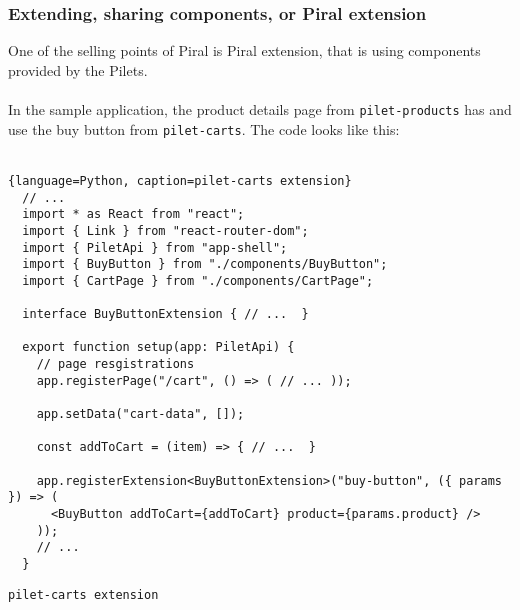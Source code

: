 \documentclass[a4paper]{book}
\begin{document}
\subsubsection{Extending, sharing components, or Piral extension}
One of the selling points of Piral is Piral extension, that is using components provided by the Pilets. 
\\ \\
In the sample application, the product details page from \verb|pilet-products| has and use the buy button from \verb|pilet-carts|. The code looks like this:
\\ \\

\begin{lstlisting}{language=Python, caption=pilet-carts extension}
  // ...
  import * as React from "react";
  import { Link } from "react-router-dom";
  import { PiletApi } from "app-shell";
  import { BuyButton } from "./components/BuyButton";
  import { CartPage } from "./components/CartPage";
  
  interface BuyButtonExtension { // ...  }
  
  export function setup(app: PiletApi) {
    // page resgistrations
    app.registerPage("/cart", () => ( // ... ));
    
    app.setData("cart-data", []);
  
    const addToCart = (item) => { // ...  }
  
    app.registerExtension<BuyButtonExtension>("buy-button", ({ params }) => (
      <BuyButton addToCart={addToCart} product={params.product} />
    ));
    // ...
  }
\end{lstlisting}
\verb|pilet-carts extension|
\end{document}
